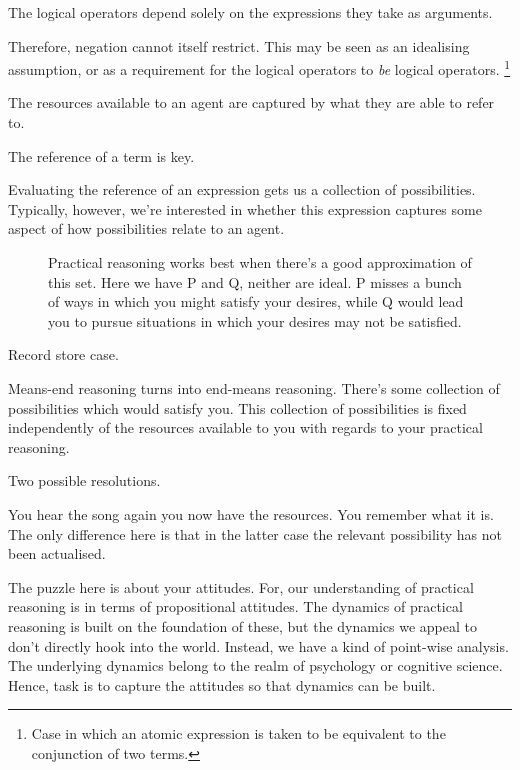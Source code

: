 \documentclass[10pt]{article}
\begin{document}
The logical operators depend solely on the expressions they take as arguments.



Therefore, negation cannot itself restrict.
This may be seen as an idealising assumption, or as a requirement for the logical operators to \emph{be} logical operators.\nolinebreak
\footnote{Case in which an atomic expression is taken to be equivalent to the conjunction of two terms.}

The resources available to an agent are captured by what they are able to refer to.






\newpage

The reference of a term is key.

Evaluating the reference of an expression gets us a collection of possibilities.
Typically, however, we're interested in whether this expression captures some aspect of how possibilities relate to an agent.








\begin{figure}[ht]
  \caption{Practical reasoning works best when there's a good approximation of this set.
    Here we have P and Q, neither are ideal.
    P misses a bunch of ways in which you might satisfy your desires, while Q would lead you to pursue situations in which your desires may not be satisfied.}
\end{figure}

\newpage



Record store case.

Means-end reasoning turns into end-means reasoning.
There's some collection of possibilities which would satisfy you.
This collection of possibilities is fixed independently of the resources available to you with regards to your practical reasoning.

Two possible resolutions.

You hear the song again you now have the resources.
You remember what it is.
The only difference here is that in the latter case the relevant possibility has not been actualised.

The puzzle here is about your attitudes.
For, our understanding of practical reasoning is in terms of propositional attitudes.
The dynamics of practical reasoning is built on the foundation of these, but the dynamics we appeal to don't directly hook into the world.
Instead, we have a kind of point-wise analysis.
The underlying dynamics belong to the realm of psychology or cognitive science.
Hence, task is to capture the attitudes so that dynamics can be built.
\end{document}
